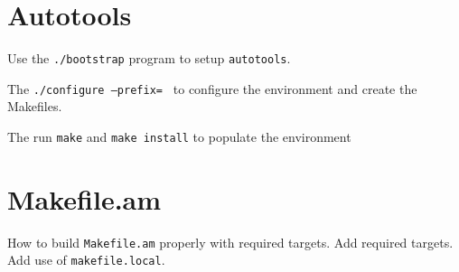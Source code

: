 
\section{Autotools}
Use the \texttt{./bootstrap} program to setup \texttt{autotools}.

The \texttt{./configure --prefix=~} to configure the environment
and create the Makefiles.

The run \texttt{make} and \texttt{make install} to populate the
environment

\section{Makefile.am}

How to build \texttt{Makefile.am} properly with required targets.
Add required targets. Add use of \texttt{makefile.local}.



